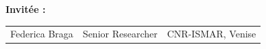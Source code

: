 \documentclass[
  letterpaper,
  11pt,
  english,
  singlespacing,
  headsepline]{MastersDoctoralThesis}
\newcommand{\startonrightwithgap}{%
  \clearpage
  \ifodd\value{page}
    \thispagestyle{empty}\mbox{}\clearpage
    \thispagestyle{empty}\mbox{}\clearpage
  \else
    \thispagestyle{empty}\mbox{}\clearpage
  \fi
}
\begin{document}
\begin{titlepage}
{\fontsize{11}{15}\selectfont \textbf{Invitée : }}


\begin{tabular}{@{}l l l@{}}
    {\fontsize{10}{14}\selectfont \textcolor{textgray}{Federica Braga}} & 
    {\fontsize{10}{14}\selectfont \textcolor{textgray}{Senior Researcher}} & 
    {\fontsize{10}{14}\selectfont \textcolor{textgray}{CNR-ISMAR, Venise}} \\

\end{tabular}
\end{titlepage}

\restoregeometry

\renewcommand{\familydefault}{\rmdefault}




% 
  \startonrightwithgap
  \begin{acknowledgements}
    \addchaptertocentry{\acknowledgementname} %
          
      \end{acknowledgements}
\end{document}
